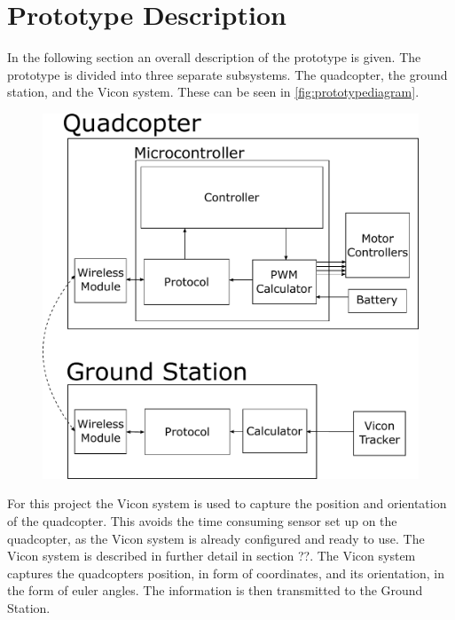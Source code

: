 \section{Prototype Description}
\label{sec:PrototypeDescription}
In the following section an overall description of the prototype is given. %
The prototype is divided into three separate subsystems. The quadcopter, the ground station, and the Vicon system. These can be seen in \autoref{fig:prototypediagram}. 

\begin{figure}[H] 
	\includegraphics[scale=.5]{figures/prototypediagram}
	\centering
	\captionsetup{justification=centering}
	\label{fig:prototypediagram}
\end{figure}


For this project the Vicon system is used to capture the position and orientation of the quadcopter. This avoids the time consuming sensor set up on the quadcopter, as the Vicon system is already configured and ready to use. The Vicon system is described in further detail in section ??. The Vicon system captures the quadcopters position, in form of coordinates, and its orientation, in the form of euler angles. The information is then transmitted to the Ground Station.

